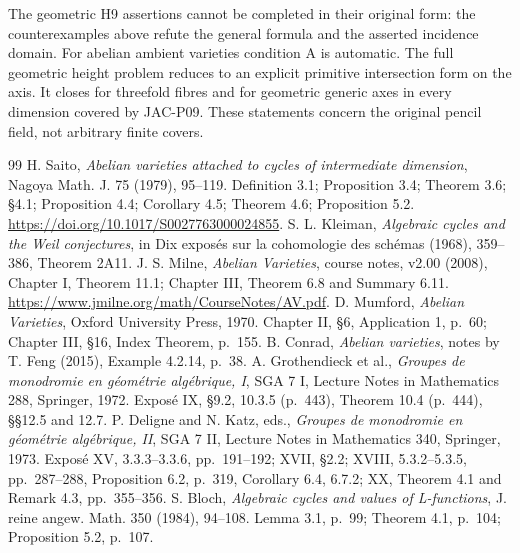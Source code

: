 \documentclass[11pt,a4paper]{article}
\begin{document}
The geometric H9 assertions cannot be completed in their original form:
the counterexamples above refute the general formula and the asserted
incidence domain. For abelian ambient varieties condition A is automatic.
The full geometric height problem reduces to an explicit primitive
intersection form on the axis. It closes for threefold fibres and for
geometric generic axes in every dimension covered by JAC-P09. These
statements concern the original pencil field, not arbitrary finite covers.
\begin{thebibliography}{99}
 H. Saito, \emph{Abelian varieties attached to cycles of intermediate dimension}, Nagoya Math. J. 75 (1979), 95--119. Definition 3.1; Proposition 3.4; Theorem 3.6; \S4.1; Proposition 4.4; Corollary 4.5; Theorem 4.6; Proposition 5.2. \url{https://doi.org/10.1017/S0027763000024855}.
 S. L. Kleiman, \emph{Algebraic cycles and the Weil conjectures}, in Dix expos\'es sur la cohomologie des sch\'emas (1968), 359--386, Theorem 2A11.
 J. S. Milne, \emph{Abelian Varieties}, course notes, v2.00 (2008), Chapter I, Theorem 11.1; Chapter III, Theorem 6.8 and Summary 6.11. \url{https://www.jmilne.org/math/CourseNotes/AV.pdf}.
 D. Mumford, \emph{Abelian Varieties}, Oxford University Press, 1970. Chapter II, \S6, Application 1, p.~60; Chapter III, \S16, Index Theorem, p.~155.
 B. Conrad, \emph{Abelian varieties}, notes by T. Feng (2015), Example 4.2.14, p.~38.
 A. Grothendieck et al., \emph{Groupes de monodromie en g\'eom\'etrie alg\'ebrique, I}, SGA 7 I, Lecture Notes in Mathematics 288, Springer, 1972. Expos\'e IX, \S9.2, 10.3.5 (p.~443), Theorem 10.4 (p.~444), \S\S12.5 and 12.7.
 P. Deligne and N. Katz, eds., \emph{Groupes de monodromie en g\'eom\'etrie alg\'ebrique, II}, SGA 7 II, Lecture Notes in Mathematics 340, Springer, 1973. Expos\'e XV, 3.3.3--3.3.6, pp.~191--192; XVII, \S2.2; XVIII, 5.3.2--5.3.5, pp.~287--288, Proposition 6.2, p.~319, Corollary 6.4, 6.7.2; XX, Theorem 4.1 and Remark 4.3, pp.~355--356.
 S. Bloch, \emph{Algebraic cycles and values of L-functions}, J. reine angew. Math. 350 (1984), 94--108. Lemma 3.1, p.~99; Theorem 4.1, p.~104; Proposition 5.2, p.~107.
\end{thebibliography}
\end{document}
